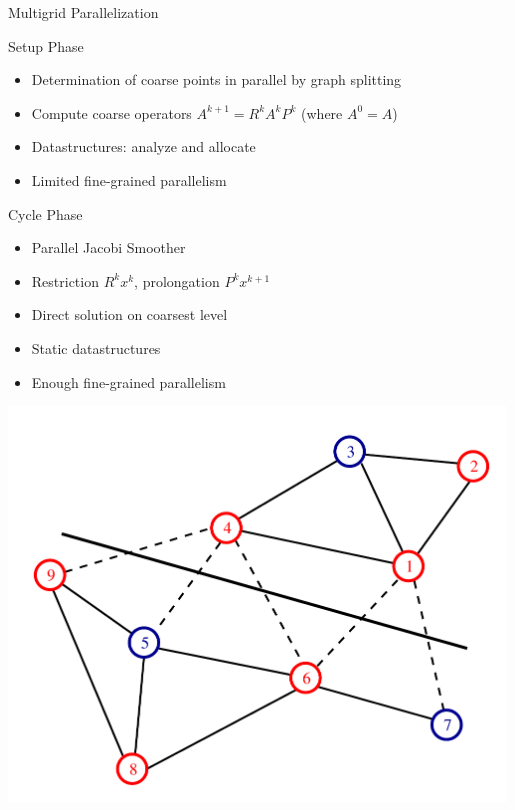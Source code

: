 \begin{frame}{Multigrid Parallelization}

 \begin{block}{Setup Phase}
  \begin{itemize}
   \item Determination of coarse points in parallel by graph splitting
   \item Compute coarse operators $A^{k+1} = R^k A^k P^k$ (where $A^0 = A$)
   \item Datastructures: analyze and allocate
   \item Limited fine-grained parallelism
  \end{itemize}
 \end{block}

 \begin{minipage}{0.58\textwidth}
 \begin{block}{Cycle Phase}
  \begin{itemize}
   \item Parallel Jacobi Smoother
   \item Restriction $R^k x^k$, prolongation $P^k x^{k+1}$
   \item Direct solution on coarsest level
   \item Static datastructures
   \item Enough fine-grained parallelism
  \end{itemize}
 \end{block}
 \end{minipage}
 \begin{minipage}{0.4\textwidth} \vspace*{-1.5cm}
  \includegraphics[width=0.99\textwidth]{figures/graph-rs0.pdf} \\ \vspace*{0.1cm}

\end{minipage}
\end{frame}
